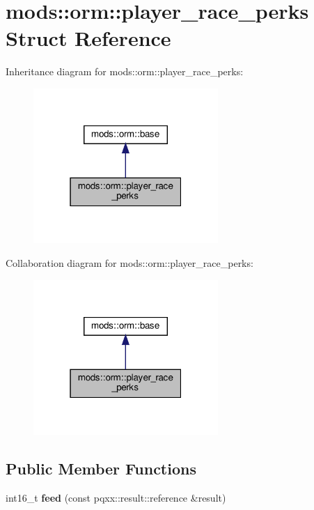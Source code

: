 \hypertarget{structmods_1_1orm_1_1player__race__perks}{}\section{mods\+:\+:orm\+:\+:player\+\_\+race\+\_\+perks Struct Reference}
\label{structmods_1_1orm_1_1player__race__perks}


Inheritance diagram for mods\+:\+:orm\+:\+:player\+\_\+race\+\_\+perks\+:
\nopagebreak
\begin{figure}[H]
\begin{center}
\leavevmode
\includegraphics[width=199pt]{structmods_1_1orm_1_1player__race__perks__inherit__graph}
\end{center}
\end{figure}


Collaboration diagram for mods\+:\+:orm\+:\+:player\+\_\+race\+\_\+perks\+:
\nopagebreak
\begin{figure}[H]
\begin{center}
\leavevmode
\includegraphics[width=199pt]{structmods_1_1orm_1_1player__race__perks__coll__graph}
\end{center}
\end{figure}
\subsection*{Public Member Functions}
\begin{DoxyCompactItemize}
\item 
\mbox{\label{structmods_1_1orm_1_1player__race__perks_a4c449958b5bf988ba4565d2d075b0c20}} 
int16\+\_\+t {\bfseries feed} (const pqxx\+::result\+::reference \&result)
\end{DoxyCompactItemize}
